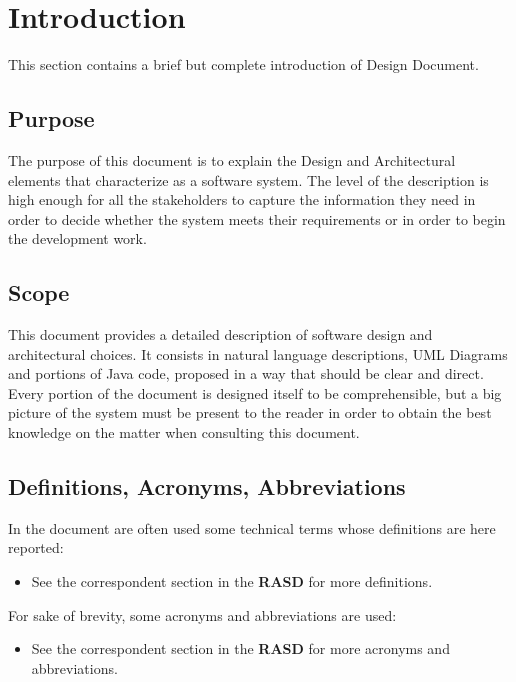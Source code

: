 \section{Introduction}
This section contains a brief but complete introduction of \myTaxiService{} Design Document.
%
\subsection{Purpose}
The purpose of this document is to explain the Design and Architectural elements that characterize \myTaxiService{} as a software system. The level of the description is high enough for all the stakeholders to capture the information they need in order to decide whether the system meets their requirements or in order to begin the development work.
%
\subsection{Scope}
This document provides a detailed description of \myTaxiService{} software design and architectural choices.
It consists in natural language descriptions, UML Diagrams and portions of Java code, proposed in a way that should be clear and direct.
Every portion of the document is designed itself to be comprehensible, but a big picture of the system must be present to the reader in order to obtain the best knowledge on the matter when consulting this document.
%
\subsection{Definitions, Acronyms, Abbreviations}
In the document are often used some technical terms whose definitions are here reported:
\begin{itemize}
	 A software level in a software system.
	 An hardware level in a software system.
	 A digital database whose organization is based on the relational model of data, as proposed by E.F. Codd in 1970.
	 A strict application of MVC principles.
	\item See the correspondent section in the \textbf{RASD} for more definitions.
\end{itemize}
For sake of brevity, some acronyms and abbreviations are used:
\begin{itemize}
	 Design Document.
	 Global Positioning System.
	 Graphic User Interface.
	 Application Programming Interface.
	 Model View Controller.
	 Estimated Time of Arrival.
	\item See the correspondent section in the \textbf{RASD} for more acronyms and abbreviations.
\end{itemize}
%
